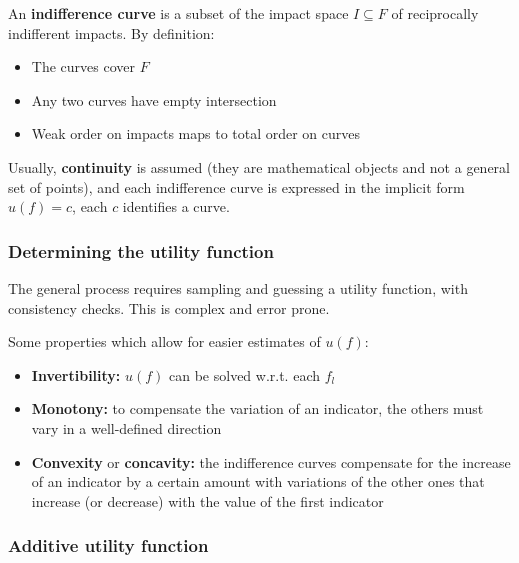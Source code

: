 An \textbf{indifference curve} is a subset of the impact space $I \subseteq F$ of reciprocally indifferent impacts. By definition: 
\begin{itemize}
	\item The curves cover $F$
	
	\item Any two curves have empty intersection
	
	\item Weak order on impacts maps to total order on curves
\end{itemize}

Usually, \textbf{continuity} is assumed (they are mathematical objects and not a general set of points), and each indifference curve is expressed in the implicit form $ u(f) = c$, each $c$ identifies a curve.


\subsubsection{Determining the utility function}

The general process requires sampling and guessing a utility function, with consistency checks. This is complex and error prone. 

Some properties which allow for easier estimates of $u(f)$: 
\begin{itemize}
	\item \textbf{Invertibility:} $u(f)$ can be solved w.r.t. each $f_l$
	
	\item \textbf{Monotony:} to compensate the variation of an indicator, the others must vary in a well-defined direction
	
	\item \textbf{Convexity} or \textbf{concavity:} the indifference curves compensate for the increase 	of an indicator by a certain amount with variations of the other ones that increase (or decrease) with the value of the first indicator
\end{itemize}

\subsubsection{Additive utility function}

